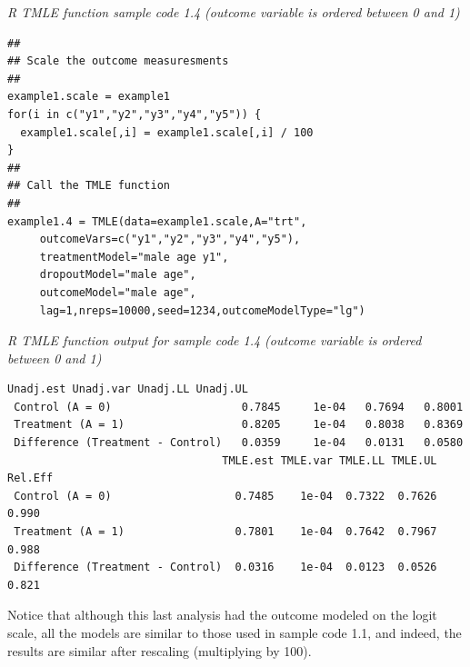 \documentclass[10pt]{article}
\renewcommand{\baselinestretch}{1.3}
\begin{document}
\begin{minipage}{\textwidth}
\renewcommand{\baselinestretch}{1.0}\selectfont%
\begin{minipage}[l]{5.6in}
\normalsize\em%
R TMLE function sample code 1.4 (outcome variable is ordered between 0 and 1)
\end{minipage}\vspace{-0.08in}
\begin{Verbatim}[baselinestretch=0.9, fontsize=\small, frame=single, commandchars=\\\{\}]
##
## Scale the outcome measuresments
##
example1.scale = example1
for(i in c("y1","y2","y3","y4","y5")) {
  example1.scale[,i] = example1.scale[,i] / 100
}
##
## Call the TMLE function
##
example1.4 = TMLE(data=example1.scale,A="trt",
     outcomeVars=c("y1","y2","y3","y4","y5"),
     treatmentModel="male age y1",
     dropoutModel="male age",
     outcomeModel="male age",
     lag=1,nreps=10000,seed=1234,outcomeModelType="lg")
\end{Verbatim}
\end{minipage}
\vspace{0.2in}
\begin{minipage}{\textwidth}
\renewcommand{\baselinestretch}{1.0}\selectfont%
\begin{minipage}[l]{5.6in}
\normalsize\em%
R TMLE function output for sample code 1.4 (outcome variable is ordered between 0 and 1)
\end{minipage}\vspace{-0.08in}
\begin{Verbatim}[baselinestretch=0.9, fontsize=\small, frame=single, commandchars=\\\{\}]
                                 Unadj.est Unadj.var Unadj.LL Unadj.UL
 Control (A = 0)                    0.7845     1e-04   0.7694   0.8001
 Treatment (A = 1)                  0.8205     1e-04   0.8038   0.8369
 Difference (Treatment - Control)   0.0359     1e-04   0.0131   0.0580
                                 TMLE.est TMLE.var TMLE.LL TMLE.UL Rel.Eff
 Control (A = 0)                   0.7485    1e-04  0.7322  0.7626   0.990
 Treatment (A = 1)                 0.7801    1e-04  0.7642  0.7967   0.988
 Difference (Treatment - Control)  0.0316    1e-04  0.0123  0.0526   0.821
\end{Verbatim}
\end{minipage}
\vspace{0.2in}

Notice that although this last analysis had the outcome modeled on the logit scale, all the models are similar to those used in sample code 1.1, and indeed, the results are similar after rescaling (multiplying by 100).
\end{document}
